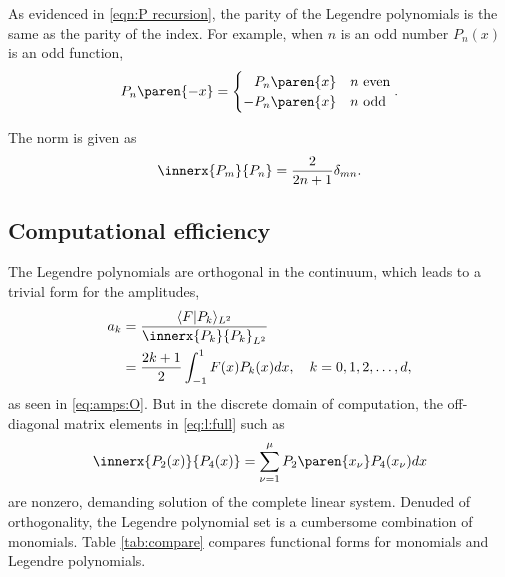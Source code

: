 \documentclass[conference]{worldcomp}
\begin{document}
As evidenced in \eqref{eqn:P recursion}, the parity of the Legendre polynomials is the same as the parity of the index. For example, when $n$ is an odd number $P_{n}(x)$ is an odd function,
  \begin{equation}
      P_{n}\paren{-x} =
      \begin{cases}
        \phantom{-}P_{n}\paren{x} & n \text{ even} \\
        -P_{n}\paren{x} & n \text{ odd}
      \end{cases} .
  \end{equation}

The norm is given as
  \begin{equation}
    \innerx{P_{m}}{P_{n}} = \frac{2} {2n + 1} \delta_{mn} .
    \label{eqn:normL}
  \end{equation}

\subsection{Computational efficiency}
The Legendre polynomials are orthogonal in the continuum, which leads to a trivial form for the amplitudes,
  \begin{equation}
  \begin{split}
    a_{k} &= \frac{\innerxL{F}{P_{k}}}{\innerx{P_{k}}{P_{k}}_{\bigL}} \\
          &= \frac{2k+1} {2} \int_{-1}^{1}{F(x)P_{k}(x)dx}, \quad k=0,1,2,\dots,d,
    \label{eq:amps:L}
  \end{split}
  \end{equation}
as seen in \eqref{eq:amps:O}.
But in the discrete domain of computation, the off-diagonal matrix elements in \eqref{eq:l:full} such as
  \begin{equation}
    \innerx{P_{2}(x)} {P_{4}(x)} = \sum_{\nu=1}^{\mu}{P_{2}\paren{x_{\nu}}P_{4}(x_{\nu}) dx}
  \end{equation}
are nonzero, demanding solution of the complete linear system. Denuded of orthogonality, the Legendre polynomial set is a cumbersome combination of monomials. Table \ref{tab:compare} compares functional forms for monomials and Legendre polynomials.
\end{document}
